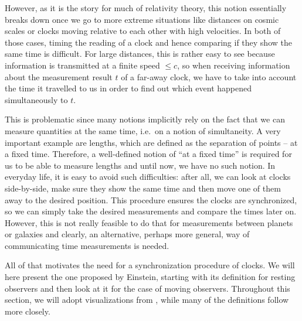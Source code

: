 However, as it is the story for much of relativity theory, this notion essentially breaks down once we go to more extreme situations like distances on cosmic scales or clocks moving relative to each other with high velocities. In both of those cases, timing the reading of a clock and hence comparing if they show the same time is difficult. For large distances, this is rather easy to see because information is transmitted at a finite speed $\leq c$, so when receiving information about the measurement result $t$ of a far-away clock, we have to take into account the time it travelled to us in order to find out which event happened simultaneously to $t$.

This is problematic since many notions implicitly rely on the fact that we can measure quantities at the same time, i.e.~on a notion of simultaneity. A very important example are lengths, which are defined as the separation of points -- at a fixed time. Therefore, a well-defined notion of \enquote{at a fixed time} is required for us to be able to measure lengths and until now, we have no such notion. In everyday life, it is easy to avoid such difficulties: after all, we can look at clocks side-by-side, make sure they show the same time and then move one of them away to the desired position. This procedure ensures the clocks are synchronized, so we can simply take the desired measurements and compare the times later on. However, this is not really feasible to do that for measurements between planets or galaxies and clearly, an alternative, perhaps more general, way of communicating time measurements is needed.


All of that motivates the need for a synchronization procedure of clocks. We will here present the one proposed by Einstein, starting with its definition for resting observers and then look at it for the case of moving observers. Throughout this section, we will adopt visualizations from \cite{dragon_geometry_srt}, while many of the definitions follow \cite{giulini_srt} more closely.



